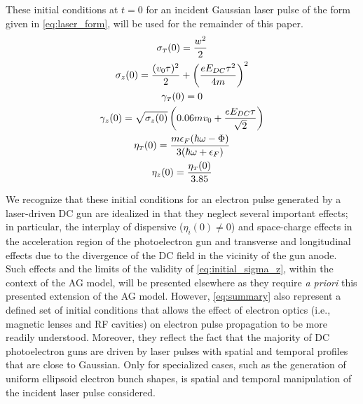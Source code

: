 These initial conditions at $t=0$ for an incident Gaussian laser pulse of the form given in \ref{eq:laser_form}, will be used for the remainder of this paper.
\begin{subequations} \label{eq:summary}
  \begin{gather}
    \sigma_{ {\scriptscriptstyle T} } ( 0 ) = \frac{ w^{ 2 } }{ 2 } \\
    \sigma_{ z } ( 0 ) = \frac{ ( v_{ 0 } \tau )^{ 2 } }{ 2 } + \left ( \frac{ e E_{ DC } \tau^{ 2 } }{ 4 m } \right )^{ 2 } \\
    \gamma_{ {\scriptscriptstyle T} } ( 0 ) = 0 \\
    \gamma_{ z } ( 0 ) = \sqrt{ \sigma_{ z } ( 0 ) } \left ( 0.06 m v_{ 0 } + \frac{ e E_{DC} \tau }{ \sqrt{ 2 } } \right ) \\
    \eta_{ {\scriptscriptstyle T} } ( 0 ) = \frac{ m \epsilon_{ F } ( \hbar \omega - \Phi ) }{ 3 ( \hbar \omega + \epsilon_{ F } ) } \\
    \eta_{ z } ( 0 ) = \frac{ \eta_{ {\scriptscriptstyle T} } ( 0 ) }{ 3.85 }
  \end{gather}
\end{subequations}

We recognize that these initial conditions for an electron pulse generated by a laser-driven DC gun are idealized in that they neglect several important effects; in particular, the interplay of dispersive ($ \eta_{i}(0) \neq 0 $) and space-charge effects in the acceleration region of the photoelectron gun and transverse and longitudinal effects due to the divergence of the DC field in the vicinity of the gun anode.\cite{berger_dc_2009,togawa_ceb6_2007}
Such effects and the limits of the validity of \ref{eq:initial_sigma_z}, within the context of the AG model, will be presented elsewhere as they require \textit{a priori} this presented extension of the AG model.
However, \ref{eq:summary} also represent a defined set of initial conditions that allows the effect of electron optics (i.e., magnetic lenses and RF cavities) on electron pulse propagation to be more readily understood.
Moreover, they reflect the fact that the majority of DC photoelectron guns are driven by laser pulses with spatial and temporal profiles that are close to Gaussian.\cite{williamson_clocking_1997,sciaini_electronic_2009}
Only for specialized cases, such as the generation of uniform ellipsoid electron bunch shapes, is spatial and temporal manipulation of the incident laser pulse considered.\cite{luiten_how_2004,li_generating_2008}


